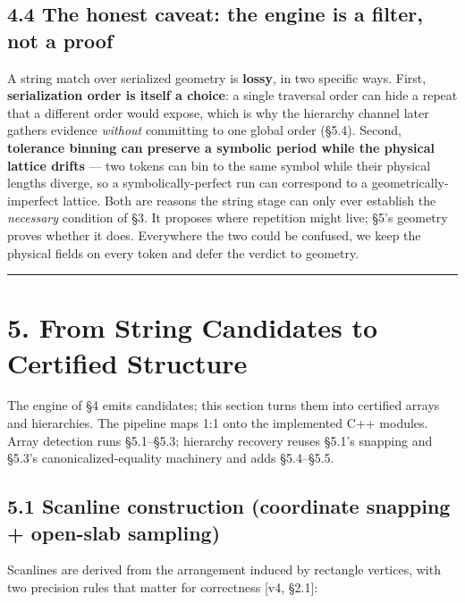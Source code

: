 \documentclass[
  11pt,
]{article}
\begin{document}
\subsection{4.4 The honest caveat: the engine is a filter, not a
proof}\label{the-honest-caveat-the-engine-is-a-filter-not-a-proof}

A string match over serialized geometry is \textbf{lossy}, in two
specific ways. First, \textbf{serialization order is itself a choice}: a
single traversal order can hide a repeat that a different order would
expose, which is why the hierarchy channel later gathers evidence
\emph{without} committing to one global order (§5.4). Second,
\textbf{tolerance binning can preserve a symbolic period while the
physical lattice drifts} --- two tokens can bin to the same symbol while
their physical lengths diverge, so a symbolically-perfect run can
correspond to a geometrically-imperfect lattice. Both are reasons the
string stage can only ever establish the \emph{necessary} condition of
§3. It proposes where repetition might live; §5's geometry proves
whether it does. Everywhere the two could be confused, we keep the
physical fields on every token and defer the verdict to geometry.

\begin{center}\rule{0.5\linewidth}{0.5pt}\end{center}

\section{5. From String Candidates to Certified
Structure}\label{from-string-candidates-to-certified-structure}

The engine of §4 emits candidates; this section turns them into
certified arrays and hierarchies. The pipeline maps 1:1 onto the
implemented C++ modules. Array detection runs §5.1--§5.3; hierarchy
recovery reuses §5.1's snapping and §5.3's canonicalized-equality
machinery and adds §5.4--§5.5.

\subsection{5.1 Scanline construction (coordinate snapping + open-slab
sampling)}\label{scanline-construction-coordinate-snapping-open-slab-sampling}

Scanlines are derived from the arrangement induced by rectangle
vertices, with two precision rules that matter for correctness {[}v4,
§2.1{]}:
\end{document}
